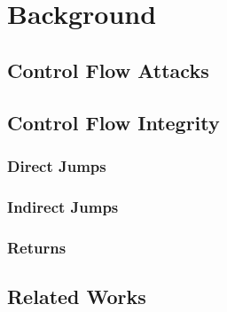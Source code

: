 \chapter{Background}
\label{cha:background}

\section{Control Flow Attacks}
\label{sec:background_cfa}

\section{Control Flow Integrity}
\label{sec:background_cfi}

\subsection{Direct Jumps}
\label{subsec:background_dirj}

\subsection{Indirect Jumps}
\label{subsec:background_indirj}

\subsection{Returns}
\label{subsec:background_returns}

\section{Related Works}
\label{sec:background_related}